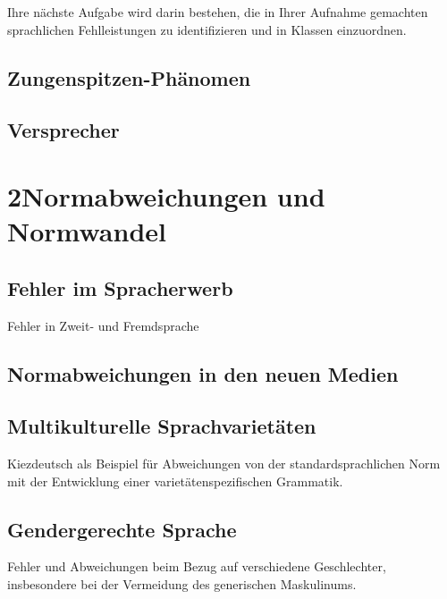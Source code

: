 \documentclass[
  letterpaper,
]{scrbook}
\begin{document}
Ihre nächste Aufgabe wird darin bestehen, die in Ihrer Aufnahme
gemachten sprachlichen Fehlleistungen zu identifizieren und in Klassen
einzuordnen.

\hypertarget{sec-zungenspitze}{%
\chapter{Zungenspitzen-Phänomen}\label{sec-zungenspitze}}

\hypertarget{sec-versprecher}{%
\chapter{Versprecher}\label{sec-versprecher}}

\part{2Normabweichungen und Normwandel}

\hypertarget{sec-spracherwerb}{%
\chapter{Fehler im Spracherwerb}\label{sec-spracherwerb}}

Fehler in Zweit- und Fremdsprache

\hypertarget{sec-medien}{%
\chapter{Normabweichungen in den neuen Medien}\label{sec-medien}}

\hypertarget{sec-multikulti}{%
\chapter{Multikulturelle Sprachvarietäten}\label{sec-multikulti}}

Kiezdeutsch als Beispiel für Abweichungen von der standardsprachlichen
Norm mit der Entwicklung einer varietätenspezifischen Grammatik.

\hypertarget{sec-gender}{%
\chapter{Gendergerechte Sprache}\label{sec-gender}}

Fehler und Abweichungen beim Bezug auf verschiedene Geschlechter,
insbesondere bei der Vermeidung des generischen Maskulinums.

\end{document}
